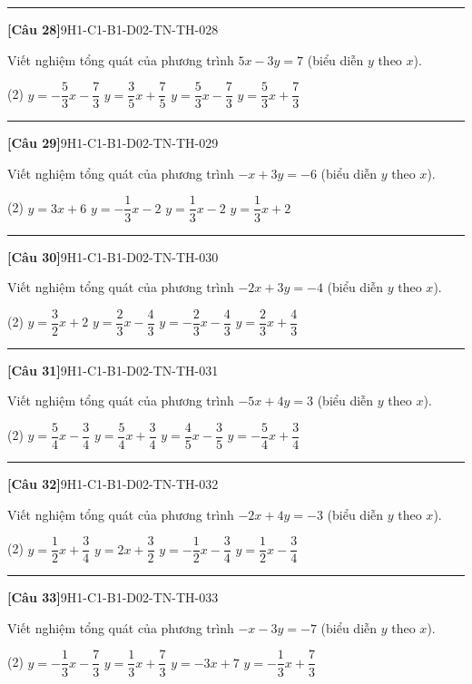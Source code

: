 \documentclass[12pt,a4paper]{article}
\newif\ifloigiai
\newenvironment{cauhoi}[2]{%
  \par\medskip\noindent\rule{\textwidth}{0.4pt}\par\nopagebreak
  \noindent\textbf{[#1]}\hfill{\scriptsize\ttfamily #2}\par\nopagebreak\smallskip}{\par}
\newcommand{\dapan}[1]{\ifloigiai\par\smallskip\noindent\textit{Đáp án:} \textbf{#1}\par\fi}
\begin{document}
\begin{cauhoi}{Câu 28}{9H1-C1-B1-D02-TN-TH-028}
Viết nghiệm tổng quát của phương trình $5x-3y=7$ (biểu diễn $y$ theo $x$).
\begin{tasks}(2)
\task $y=-\dfrac{5}{3}x-\dfrac{7}{3}$
\task $y=\dfrac{3}{5}x+\dfrac{7}{5}$
\task $y=\dfrac{5}{3}x-\dfrac{7}{3}$
\task $y=\dfrac{5}{3}x+\dfrac{7}{3}$
\end{tasks}
\dapan{C}
\end{cauhoi}
\begin{cauhoi}{Câu 29}{9H1-C1-B1-D02-TN-TH-029}
Viết nghiệm tổng quát của phương trình $-x+3y=-6$ (biểu diễn $y$ theo $x$).
\begin{tasks}(2)
\task $y=3x+6$
\task $y=-\dfrac{1}{3}x-2$
\task $y=\dfrac{1}{3}x-2$
\task $y=\dfrac{1}{3}x+2$
\end{tasks}
\dapan{C}
\end{cauhoi}
\begin{cauhoi}{Câu 30}{9H1-C1-B1-D02-TN-TH-030}
Viết nghiệm tổng quát của phương trình $-2x+3y=-4$ (biểu diễn $y$ theo $x$).
\begin{tasks}(2)
\task $y=\dfrac{3}{2}x+2$
\task $y=\dfrac{2}{3}x-\dfrac{4}{3}$
\task $y=-\dfrac{2}{3}x-\dfrac{4}{3}$
\task $y=\dfrac{2}{3}x+\dfrac{4}{3}$
\end{tasks}
\dapan{B}
\end{cauhoi}
\begin{cauhoi}{Câu 31}{9H1-C1-B1-D02-TN-TH-031}
Viết nghiệm tổng quát của phương trình $-5x+4y=3$ (biểu diễn $y$ theo $x$).
\begin{tasks}(2)
\task $y=\dfrac{5}{4}x-\dfrac{3}{4}$
\task $y=\dfrac{5}{4}x+\dfrac{3}{4}$
\task $y=\dfrac{4}{5}x-\dfrac{3}{5}$
\task $y=-\dfrac{5}{4}x+\dfrac{3}{4}$
\end{tasks}
\dapan{B}
\end{cauhoi}
\begin{cauhoi}{Câu 32}{9H1-C1-B1-D02-TN-TH-032}
Viết nghiệm tổng quát của phương trình $-2x+4y=-3$ (biểu diễn $y$ theo $x$).
\begin{tasks}(2)
\task $y=\dfrac{1}{2}x+\dfrac{3}{4}$
\task $y=2x+\dfrac{3}{2}$
\task $y=-\dfrac{1}{2}x-\dfrac{3}{4}$
\task $y=\dfrac{1}{2}x-\dfrac{3}{4}$
\end{tasks}
\dapan{D}
\end{cauhoi}
\begin{cauhoi}{Câu 33}{9H1-C1-B1-D02-TN-TH-033}
Viết nghiệm tổng quát của phương trình $-x-3y=-7$ (biểu diễn $y$ theo $x$).
\begin{tasks}(2)
\task $y=-\dfrac{1}{3}x-\dfrac{7}{3}$
\task $y=\dfrac{1}{3}x+\dfrac{7}{3}$
\task $y=-3x+7$
\task $y=-\dfrac{1}{3}x+\dfrac{7}{3}$
\end{tasks}
\dapan{D}
\end{cauhoi}
\end{document}

